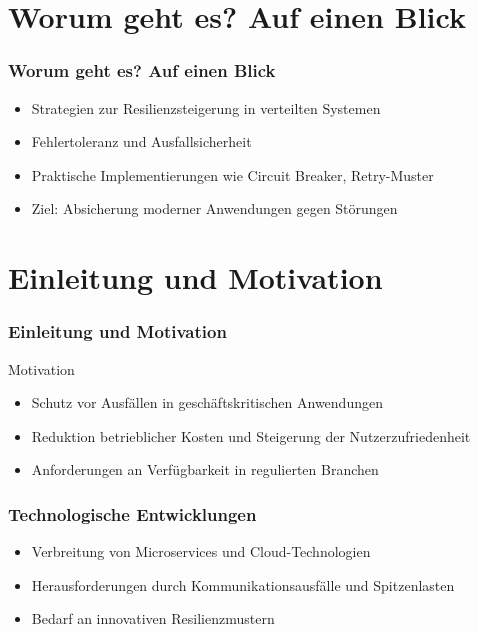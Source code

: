 \section{Worum geht es? Auf einen Blick}

\begin{frame}
    \frametitle{Worum geht es? Auf einen Blick}
    \begin{itemize}
        \item<1-> Strategien zur Resilienzsteigerung in verteilten Systemen
        \item<2-> Fehlertoleranz und Ausfallsicherheit
        \item<3-> Praktische Implementierungen wie Circuit Breaker, Retry-Muster
        \item<4-> Ziel: Absicherung moderner Anwendungen gegen Störungen
    \end{itemize}
\end{frame}

\section{Einleitung und Motivation}

\begin{frame}
    \frametitle{Einleitung und Motivation}
    \begin{block}{Motivation}
        \begin{itemize}
            \item Schutz vor Ausfällen in geschäftskritischen Anwendungen
            \item Reduktion betrieblicher Kosten und Steigerung der Nutzerzufriedenheit
            \item Anforderungen an Verfügbarkeit in regulierten Branchen
        \end{itemize}
    \end{block}
\end{frame}

\begin{frame}
    \frametitle{Technologische Entwicklungen}
    \begin{itemize}
        \item Verbreitung von Microservices und Cloud-Technologien
        \item Herausforderungen durch Kommunikationsausfälle und Spitzenlasten
        \item Bedarf an innovativen Resilienzmustern
    \end{itemize}
\end{frame}

